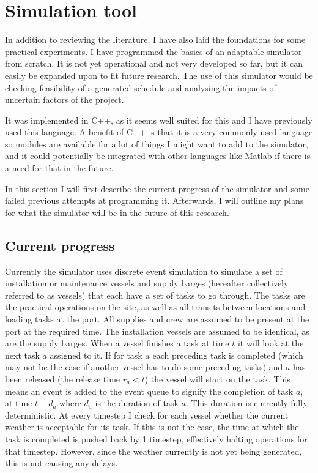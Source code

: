\documentclass[a4paper,12pt]{article}
\begin{document}
\fi

\pagebreak

\section{Simulation tool} \label{s:sim}
In addition to reviewing the literature, I have also laid the foundations for some practical experiments. I have programmed the basics of an adaptable simulator from scratch. It is not yet operational and not very developed so far, but it can easily be expanded upon to fit future research. The use of this simulator would be checking feasibility of a generated schedule and analysing the impacts of uncertain factors of the project.

It was implemented in C++, as it seems well suited for this and I have previously used this language. A benefit of C++ is that it is a very commonly used language so modules are available for a lot of things I might want to add to the simulator, and it could potentially be integrated with other languages like Matlab if there is a need for that in the future. 

In this section I will first describe the current progress of the simulator and some failed previous attempts at programming it. Afterwards, I will outline my plans for what the simulator will be in the future of this research.

\subsection{Current progress} \label{ss:simprog}
Currently the simulator uses discrete event simulation to simulate a set of installation or maintenance vessels and supply barges (hereafter collectively referred to as vessels) that each have a set of tasks to go through. The tasks are the practical operations on the site, as well as all transits between locations and loading tasks at the port. All supplies and crew are assumed to be present at the port at the required time. The installation vessels are assumed to be identical, as are the supply barges. When a vessel finishes a task at time $t$ it will look at the next task $a$ assigned to it. If for task $a$ each preceding task is completed (which may not be the case if another vessel has to do some preceding tasks) and $a$ has been released (the release time $r_a < t$) the vessel will start on the task. This means an event is added to the event queue to signify the completion of task $a$, at time $t + d_a$ where $d_a$ is the duration of task $a$. This duration is currently fully deterministic. At every timestep I check for each vessel whether the current weather is acceptable for its task. If this is not the case, the time at which the task is completed is pushed back by 1 timestep, effectively halting operations for that timestep. However, since the weather currently is not yet being generated, this is not causing any delays. 
\end{document}
